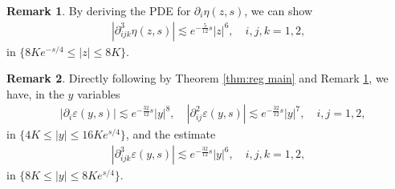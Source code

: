 \documentclass[11pt,reqno]{amsart}
\theoremstyle{definition}
\theoremstyle{bfremark}
\newtheorem{remark}{Remark}[section]
\numberwithin{equation}{section}
\begin{document}
    \begin{remark}
     \label{rmk:control of R}
         By deriving the PDE for \(\partial_i \eta(z,s)\), we can show
         \begin{align*}
             |\partial^3_{ijk}\eta(z,s)| \lesssim e^{-\frac{5}{12}s}|z|^6, \quad i,j,k=1,2,
         \end{align*}
         in \(\{8Ke^{-s/4} \leq |z| \leq 8K\}\).
     \end{remark}
     
     \begin{remark}
     \label{rmk: L2 rho control outer}
         Directly following by Theorem \ref{thm:reg main} and Remark \ref{rmk:control of R}, we have, in the \(y\) variables
         \begin{align*}
             &|\partial_i\varepsilon(y,s)| \lesssim e^{-\frac{32}{12}s}|y|^8,\quad |\partial^2_{ij}\varepsilon(y,s)| \lesssim e^{-\frac{32}{12}s}|y|^7, \quad i,j=1,2,
         \end{align*}
         in \(\{4K \leq |y| \leq 16Ke^{s/4}\}\), and the estimate
         \begin{align*}
             |\partial^3_{ijk}\varepsilon(y,s)| \lesssim e^{-\frac{32}{12}s}|y|^6, \quad i,j,k=1,2,
         \end{align*}
         in \(\{8K \leq |y| \leq 8Ke^{s/4}\}\).
     \end{remark}
     
\end{document}
